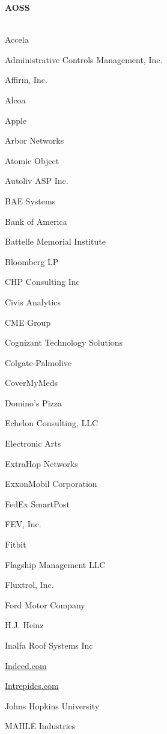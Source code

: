 \documentclass[twoside]{article}
\begin{document}
\begin{center}
\begin{multicols}{5}
        \vspace{1em}
        {\fontsize{14}{16}\selectfont \bf AOSS}\\
        \vspace{-1em}
        ~\hrulefill~
        \vspace{-.9em}
        \begin{FlushLeft}
        \begin{compactitem}
        \item Accela
\item Administrative Controls Management, Inc.
\item Affirm, Inc.
\item Alcoa
\item Apple
\item Arbor Networks
\item Atomic Object
\item Autoliv ASP Inc.
\item BAE Systems
\item Bank of America
\item Battelle Memorial Institute
\item Bloomberg LP
\item CHP Consulting Inc
\item Civis Analytics
\item CME Group
\item Cognizant Technology Solutions
\item Colgate-Palmolive
\item CoverMyMeds
\item Domino's Pizza
\item Echelon Consulting, LLC
\item Electronic Arts
\item ExtraHop Networks
\item ExxonMobil Corporation
\item FedEx SmartPost
\item FEV, Inc.
\item Fitbit
\item Flagship Management LLC
\item Fluxtrol, Inc.
\item Ford Motor Company
\item H.J. Heinz
\item Inalfa Roof Systems Inc
\item \url{Indeed.com}
\item \url{Intrepidcs.com}
\item Johns Hopkins University
\item MAHLE Industries

\end{compactitem}
\end{FlushLeft}
\end{multicols}
\end{center}
\end{document}
